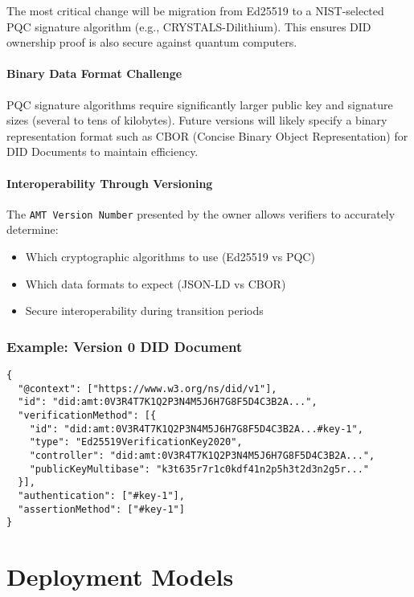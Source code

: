 The most critical change will be migration from Ed25519 to a NIST-selected PQC signature algorithm (e.g., CRYSTALS-Dilithium). This ensures DID ownership proof is also secure against quantum computers.

\subsubsection{Binary Data Format Challenge}

PQC signature algorithms require significantly larger public key and signature sizes (several to tens of kilobytes). Future versions will likely specify a binary representation format such as CBOR (Concise Binary Object Representation) for DID Documents to maintain efficiency.

\subsubsection{Interoperability Through Versioning}

The \texttt{AMT Version Number} presented by the owner allows verifiers to accurately determine:
\begin{itemize}
  \item Which cryptographic algorithms to use (Ed25519 vs PQC)
  \item Which data formats to expect (JSON-LD vs CBOR)
  \item Secure interoperability during transition periods
\end{itemize}

\subsection{Example: Version 0 DID Document}

\begin{verbatim}
{
  "@context": ["https://www.w3.org/ns/did/v1"],
  "id": "did:amt:0V3R4T7K1Q2P3N4M5J6H7G8F5D4C3B2A...",
  "verificationMethod": [{
    "id": "did:amt:0V3R4T7K1Q2P3N4M5J6H7G8F5D4C3B2A...#key-1",
    "type": "Ed25519VerificationKey2020",
    "controller": "did:amt:0V3R4T7K1Q2P3N4M5J6H7G8F5D4C3B2A...",
    "publicKeyMultibase": "k3t635r7r1c0kdf41n2p5h3t2d3n2g5r..."
  }],
  "authentication": ["#key-1"],
  "assertionMethod": ["#key-1"]
}
\end{verbatim}

\chapter{Deployment Models}

